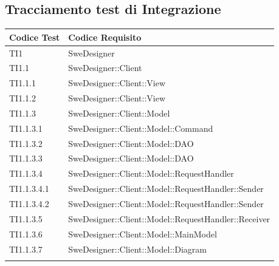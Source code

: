\documentclass[../PianoDiQualifica.tex]{subfiles}
\begin{document}
	\subsection{Tracciamento test di Integrazione}
	\begin{longtabu} to \textwidth {
			X[4,l,p]
			X[8,l,p]}
		\toprule
		 Codice Test & Codice Requisito \\
		\midrule
		\endhead
		\addlinespace[0.4em]
		\midrule
		\addlinespace[0.2em]
		TI1 & SweDesigner \\
		\addlinespace[0.2em]
		\midrule
		\addlinespace[0.2em]
		TI1.1 & SweDesigner::Client \\
		\addlinespace[0.2em]
		\midrule
		\addlinespace[0.2em]
		TI1.1.1 & SweDesigner::Client::View \\
		\addlinespace[0.2em]
		\midrule
		\addlinespace[0.2em]
		TI1.1.2 & SweDesigner::Client::View \\
		\addlinespace[0.2em]
		\midrule
		\addlinespace[0.2em]
		TI1.1.3 & SweDesigner::Client::Model \\
		\addlinespace[0.2em]
		\midrule
		\addlinespace[0.2em]
		TI1.1.3.1 & SweDesigner::Client::Model::Command \\
		\addlinespace[0.2em]
		\midrule
		\addlinespace[0.2em]
		TI1.1.3.2 & SweDesigner::Client::Model::DAO \\
		\addlinespace[0.2em]
		\midrule
		\addlinespace[0.2em]
		TI1.1.3.3 & SweDesigner::Client::Model::DAO \\
		\addlinespace[0.2em]
		\midrule
		\addlinespace[0.2em]
		TI1.1.3.4 & SweDesigner::Client::Model::RequestHandler \\
		\addlinespace[0.2em]
		\midrule
		\addlinespace[0.2em]
		TI1.1.3.4.1 & SweDesigner::Client::Model::RequestHandler::Sender \\
		\addlinespace[0.2em]
		\midrule
		\addlinespace[0.2em]
		TI1.1.3.4.2 & SweDesigner::Client::Model::RequestHandler::Sender \\
		\addlinespace[0.2em]
		\midrule
		\addlinespace[0.2em]
		TI1.1.3.5 & SweDesigner::Client::Model::RequestHandler::Receiver \\
		\addlinespace[0.2em]
		\midrule
		\addlinespace[0.2em]
		TI1.1.3.6 & SweDesigner::Client::Model::MainModel \\
		\addlinespace[0.2em]
		\midrule
		\addlinespace[0.2em]
		TI1.1.3.7 & SweDesigner::Client::Model::Diagram \\
		\addlinespace[0.2em]
		\midrule
		\addlinespace[0.2em]

\end{longtabu}
\end{document}
